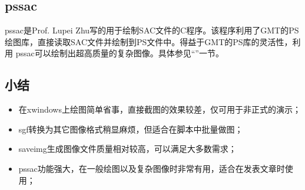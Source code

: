 \subsection{pssac}
pssac是Prof. Lupei Zhu写的用于绘制SAC文件的C程序。该程序利用了GMT的PS
绘图库，直接读取SAC文件并绘制到PS文件中。得益于GMT的PS库的灵活性，利用
pssac可以绘制出超高质量的复杂图像。具体参见``''一节。

\subsection{小结}
\begin{itemize}
\item 在xwindows上绘图简单省事，直接截图的效果较差，仅可用于非正式的演示；
\item sgf转换为其它图像格式稍显麻烦，但适合在脚本中批量做图；
\item saveimg生成图像文件质量相对较高，可以满足大多数需求；
\item pssac功能强大，在一般绘图以及复杂图像时非常有用，适合在发表文章时使用；
\end{itemize}
